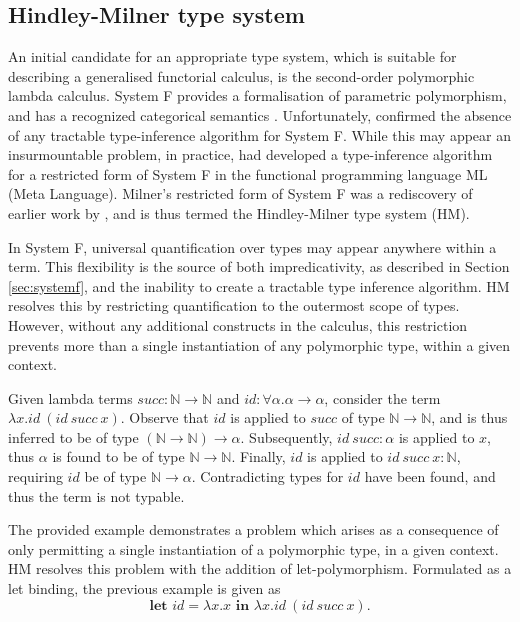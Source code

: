 \documentclass[../../Dissertation.tex]{subfiles}
\begin{document}
\subsection{Hindley-Milner type system}\label{sec:HMType}
An initial candidate for an appropriate type system, which is suitable for describing a generalised functorial calculus, is the second-order polymorphic lambda calculus. System F provides a formalisation of parametric polymorphism, and has a recognized categorical semantics \cite{SystemFVariableTypes}. Unfortunately,  confirmed the absence of any tractable type-inference algorithm for System F. While this may appear an insurmountable problem, in practice,  had developed a type-inference algorithm for a restricted form of System F in the functional programming language ML (Meta Language). Milner's restricted form of System F was a rediscovery of earlier work by , and is thus termed the Hindley-Milner type system (HM).
\par
In System F, universal quantification over types may appear anywhere within a term. This flexibility is the source of both impredicativity, as described in Section \ref{sec:systemf}, and the inability to create a tractable type inference algorithm. HM resolves this by restricting quantification to the outermost scope of types. However, without any additional constructs in the calculus, this restriction prevents more than a single instantiation of any polymorphic type, within a given context.
\par
Given lambda terms $\textit{succ} : \mathbb{N} \rightarrow \mathbb{N}$ and $\textit{id} : \forall \alpha. \alpha \rightarrow \alpha$, consider the term $\lambda x. \textit{id}\ (\textit{id}\ \textit{succ}\ x)$. Observe that $\textit{id}$ is applied to $\textit{succ}$ of type $\mathbb{N} \rightarrow \mathbb{N}$, and is thus inferred to be of type $(\mathbb{N} \rightarrow \mathbb{N}) \rightarrow \alpha$. Subsequently, $\textit{id}\ \textit{succ} : \alpha$ is applied to $x$, thus $\alpha$ is found to be of type $\mathbb{N} \rightarrow \mathbb{N}$. Finally, $\textit{id}$ is applied to $\textit{id}\ \textit{succ}\ x : \mathbb{N}$, requiring $\textit{id}$ be of type $\mathbb{N} \rightarrow \alpha$. Contradicting types for $\textit{id}$ have been found, and thus the term is not typable. 
\par
The provided example demonstrates a problem which arises as a consequence of only permitting a single instantiation of a polymorphic type, in a given context. HM resolves this problem with the addition of let-polymorphism. Formulated as a let binding, the previous example is given as 
\begin{equation*}
\textbf{let } \textit{id} = \lambda x.x \textbf{ in } \lambda x.\textit{id}\ (\textit{id}\ succ\ x).
\end{equation*}
\end{document}
